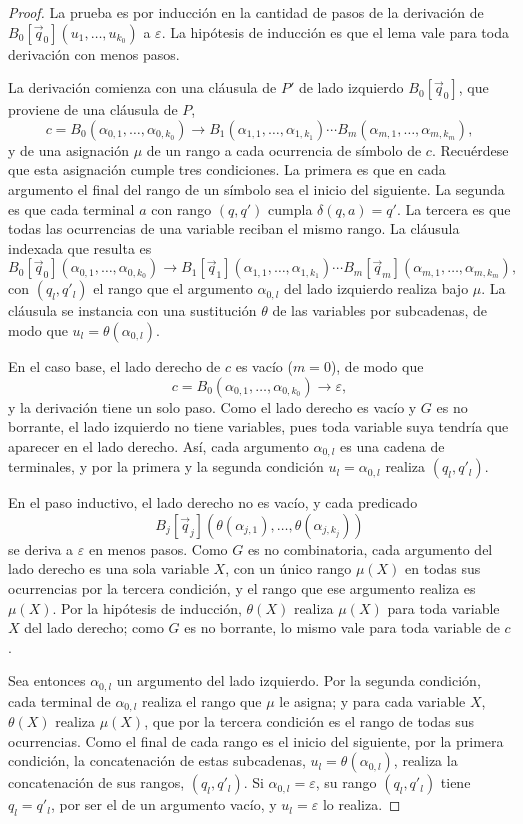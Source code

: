 \begin{proof}
La prueba es por inducción en la cantidad de pasos de la derivación de
$B_0[\vec q_0](u_1, \ldots, u_{k_0})$ a $\varepsilon$. La hipótesis de inducción
es que el lema vale para toda derivación con menos pasos.

La derivación comienza con una cláusula de $P'$ de lado izquierdo
$B_0[\vec q_0]$, que proviene de una cláusula de $P$,
\[
  c = B_0(\alpha_{0,1}, \ldots, \alpha_{0,k_0}) \to B_1(\alpha_{1,1}, \ldots, \alpha_{1,k_1}) \cdots B_m(\alpha_{m,1}, \ldots, \alpha_{m,k_m}),
\]
y de una asignación $\mu$ de un rango a cada ocurrencia de símbolo de $c$.
Recuérdese que esta asignación cumple tres condiciones. La primera es que
en cada argumento el final del rango de un símbolo sea el inicio del
siguiente. La segunda
es que cada terminal $a$ con rango $(q, q')$ cumpla $\delta(q, a) = q'$.
La tercera es que todas las ocurrencias de una variable reciban el mismo
rango. La cláusula indexada que resulta es
\[
  B_0[\vec q_0](\alpha_{0,1}, \ldots, \alpha_{0,k_0}) \to B_1[\vec q_1](\alpha_{1,1}, \ldots, \alpha_{1,k_1}) \cdots B_m[\vec q_m](\alpha_{m,1}, \ldots, \alpha_{m,k_m}),
\]
con $(q_l, q'_l)$ el rango que el argumento $\alpha_{0,l}$ del lado
izquierdo realiza bajo $\mu$. La cláusula se instancia con una sustitución $\theta$ de las
variables por subcadenas, de modo que $u_l = \theta(\alpha_{0,l})$.

En el caso base, el lado derecho de $c$ es vacío ($m = 0$), de modo que
\[
  c = B_0(\alpha_{0,1}, \ldots, \alpha_{0,k_0}) \to \varepsilon,
\]
y la derivación tiene un solo paso. Como el lado derecho es vacío y $G$
es no borrante, el lado izquierdo no tiene variables, pues toda variable
suya tendría que aparecer en el lado derecho. Así, cada argumento
$\alpha_{0,l}$ es una cadena de terminales, y por la primera y la segunda
condición $u_l = \alpha_{0,l}$ realiza $(q_l, q'_l)$.

En el paso inductivo, el lado derecho no es vacío, y cada predicado
\[
  B_j[\vec q_j](\theta(\alpha_{j,1}), \ldots, \theta(\alpha_{j,k_j}))
\]
se deriva a $\varepsilon$ en menos pasos. Como $G$ es no combinatoria, cada
argumento del lado derecho es una sola variable $X$, con un único rango
$\mu(X)$ en todas sus ocurrencias por la tercera condición, y el rango
que ese argumento realiza es $\mu(X)$. Por la hipótesis de inducción, $\theta(X)$ realiza $\mu(X)$
para toda variable $X$ del lado derecho; como $G$ es no borrante, lo
mismo vale para toda variable de $c$.

Sea entonces $\alpha_{0,l}$ un argumento del lado izquierdo. Por la
segunda condición, cada terminal de $\alpha_{0,l}$ realiza el rango que
$\mu$ le asigna; y para cada variable $X$, $\theta(X)$ realiza $\mu(X)$,
que por la tercera condición es el rango de todas sus ocurrencias. Como
el final de cada rango es el inicio del siguiente, por la primera
condición, la concatenación de estas subcadenas,
$u_l = \theta(\alpha_{0,l})$, realiza la concatenación de sus rangos,
$(q_l, q'_l)$. Si
$\alpha_{0,l} = \varepsilon$, su rango $(q_l, q'_l)$ tiene $q_l = q'_l$,
por ser el de un argumento vacío, y $u_l = \varepsilon$ lo realiza.
\end{proof}

